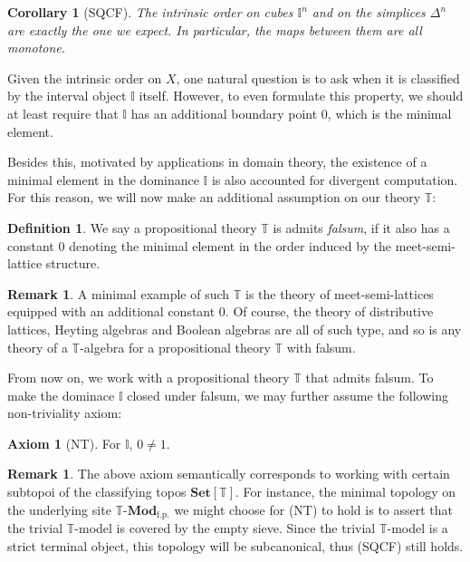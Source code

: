 \documentclass[12pt]{amsart}
\newtheorem{corollary}[theorem]{Corollary}
\theoremstyle{definition}
\newtheorem{definition}[theorem]{Definition}
\newtheorem{remark}[theorem]{Remark}
\newtheorem{axiom}{Axiom}
\newcommand{\mb}[1]{\mathbf{#1}}
\newcommand{\mbb}[1]{\mathbb{#1}}
\newcommand{\T}{\mbb T}
\newcommand{\I}{\mbb I}
\newcommand{\mr}[1]{\mathrm{#1}}
\newcommand{\Set}{\mb{Set}}
\newcommand{\fp}{_{\mr{f.p.}}}
\newcommand{\mmod}[1]{#1\text{-}\mathbf{Mod}}
\begin{document}
\begin{corollary}[SQCF]\label{cor:syntheticorderinterval}
  The intrinsic order on cubes $\I^n$ and on the simplices $\Delta^n$ are exactly the one we expect. In particular, the maps between them are all monotone.
\end{corollary}

Given the intrinsic order on $X$, one natural question is to ask when it is classified by the interval object $\I$ itself. However, to even formulate this property, we should at least require that $\I$ has an additional boundary point $0$, which is the minimal element.

Besides this, motivated by applications in domain theory, the existence of a minimal element in the dominance $\I$ is also accounted for divergent computation. For this reason, we will now make an additional assumption on our theory $\T$:

\begin{definition}
  We say a propositional theory $\T$ is admits \emph{falsum}, if it also has a constant $0$ denoting the minimal element in the order induced by the meet-semi-lattice structure.
\end{definition}

\begin{remark}
  A minimal example of such $\T$ is the theory of meet-semi-lattices equipped with an additional constant $0$. Of course, the theory of distributive lattices, Heyting algebras and Boolean algebras are all of such type, and so is any theory of a $\T$-algebra for a propositional theory $\T$ with falsum.
\end{remark}

From now on, we work with a propositional theory $\T$ that admits falsum. To make the dominace $\I$ closed under falsum, we may further assume the following non-triviality axiom:

\begin{axiom}[NT]\label{ax:nt}
  For $\I$, $0 \neq 1$.
\end{axiom}

\begin{remark}
  The above axiom semantically corresponds to working with certain subtopoi of the classifying topos $\Set[\T]$. For instance, the minimal topology on the underlying site $\mmod\T\fp$ we might choose for (NT) to hold is to assert that the trivial $\T$-model is covered by the empty sieve. Since the trivial $\T$-model is a strict terminal object, this topology will be subcanonical, thus (SQCF) still holds.
\end{remark}
\end{document}
